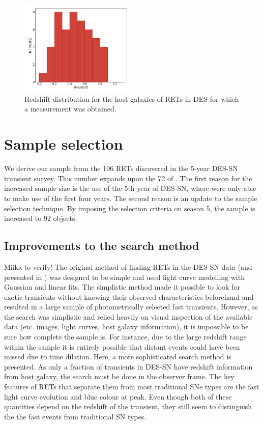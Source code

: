 \documentclass[fleqn,usenatbib,]{mnras}
\newcommand{\miika}[1]{\color{green}#1 \color{black}}
\begin{document}
\begin{figure}
\includegraphics[width=0.5\textwidth]{figs/z_dist.png}
\caption{Redshift distribution for the host galaxies of RETs in DES for which a measurement was obtained.
\label{fig:z_dist}}
\end{figure}

\section{Sample selection\label{sec:sample}}

We derive our sample from the 106 RETs discovered in the 5-year DES-SN transient survey. This number expands upon the 72 of . The first reason for the increased sample size is the use of the 5th year of DES-SN, where  were only able to make use of the first four years. The second reason is an update to the sample selection technique. By imposing the  selection criteria on season 5, the sample is increased to 92 objects.

\subsection{Improvements to the search method \label{subsec:new_method}}

\miika{Miika to verify!}
The original method of finding RETs in the DES-SN data (and presented in ) was designed to be simple and used light curve modelling with Gaussian and linear fits. The simplistic method made it possible to look for exotic transients without knowing their observed characteristics beforehand and resulted in a large sample of photometrically selected fast transients. However, as the search was simplistic and relied heavily on visual inspection of the available data (etc. images, light curves, host galaxy information), it is impossible to be sure how complete the sample is. For instance, due to the large redshift range within the sample it is entirely possible that distant events could have been missed due to time dilation. Here, a more sophisticated search method is presented. As only a fraction of transients in DES-SN have redshift information from host galaxy, the search must be done in the observer frame.  The key features of RETs that separate them from most traditional SNe types are the fast light curve evolution and blue colour at peak. Even though both of these quantities depend on the redshift of the transient, they still seem to distinguish the the fast events from traditional SN types. 
\end{document}
